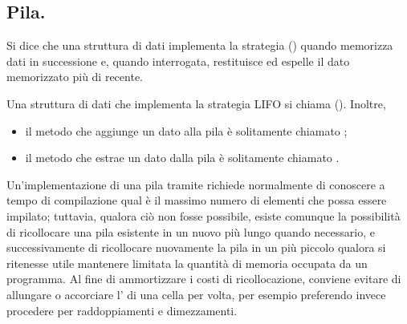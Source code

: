 \subsection{Pila.}
\label{AlgoritmiEStruttureDiDati_Pila}
\begin{Definition}
	Si dice che una struttura di dati implementa la strategia 
  () quando memorizza dati in successione e, quando
  interrogata, restituisce ed espelle il dato memorizzato pi\`u di recente.
\end{Definition}
\begin{Definition}
  Una struttura di dati che implementa la strategia LIFO si chiama 
  (). Inoltre,
  \begin{itemize}
    \item il metodo che aggiunge un dato alla pila \`e solitamente chiamato
      ;
    \item il metodo che estrae un dato dalla pila \`e solitamente chiamato
      .
  \end{itemize}
\end{Definition}
\par Un'implementazione di una pila tramite 
richiede normalmente di conoscere a tempo di compilazione qual \`e il massimo
numero di elementi che possa essere impilato; tuttavia, qualora ci\`o non fosse
possibile, esiste comunque la possibilit\`a di ricollocare una pila esistente in
un nuovo  pi\`u lungo quando
necessario, e successivamente di ricollocare nuovamente la pila in un
 pi\`u piccolo qualora si ritenesse utile mantenere limitata la
quantit\`a di memoria occupata da un programma. Al fine di ammortizzare i costi
di ricollocazione, conviene evitare di allungare o accorciare l'
di una cella per volta, per esempio preferendo invece procedere per
raddoppiamenti e dimezzamenti.
\begin{listing}
	\caption{Implementazione di una pila in : dichiarazione della classe.}
\end{listing}
\begin{listing}
	\caption{Implementazione di una pila in : costruttore.}
\end{listing}
\begin{listing}
	\caption{Implementazione di un metodo  per l'aggiunta di un elemento ad una pila.}
\end{listing}
